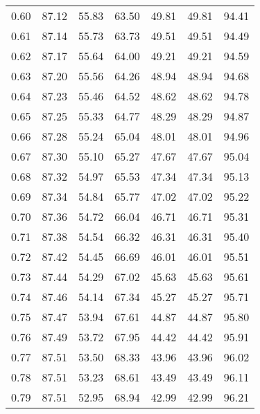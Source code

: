 \begin{tabular}{|c|c|c|c|c|c|c|}
      0.60 &     87.12 &     55.83 &      63.50 &   49.81 &      49.81 &         94.41 \\
      0.61 &     87.14 &     55.73 &      63.73 &   49.51 &      49.51 &         94.49 \\
      0.62 &     87.17 &     55.64 &      64.00 &   49.21 &      49.21 &         94.59 \\
      0.63 &     87.20 &     55.56 &      64.26 &   48.94 &      48.94 &         94.68 \\
      0.64 &     87.23 &     55.46 &      64.52 &   48.62 &      48.62 &         94.78 \\
      0.65 &     87.25 &     55.33 &      64.77 &   48.29 &      48.29 &         94.87 \\
      0.66 &     87.28 &     55.24 &      65.04 &   48.01 &      48.01 &         94.96 \\
      0.67 &     87.30 &     55.10 &      65.27 &   47.67 &      47.67 &         95.04 \\
      0.68 &     87.32 &     54.97 &      65.53 &   47.34 &      47.34 &         95.13 \\
      0.69 &     87.34 &     54.84 &      65.77 &   47.02 &      47.02 &         95.22 \\
      0.70 &     87.36 &     54.72 &      66.04 &   46.71 &      46.71 &         95.31 \\
      0.71 &     87.38 &     54.54 &      66.32 &   46.31 &      46.31 &         95.40 \\
      0.72 &     87.42 &     54.45 &      66.69 &   46.01 &      46.01 &         95.51 \\
      0.73 &     87.44 &     54.29 &      67.02 &   45.63 &      45.63 &         95.61 \\
      0.74 &     87.46 &     54.14 &      67.34 &   45.27 &      45.27 &         95.71 \\
      0.75 &     87.47 &     53.94 &      67.61 &   44.87 &      44.87 &         95.80 \\
      0.76 &     87.49 &     53.72 &      67.95 &   44.42 &      44.42 &         95.91 \\
      0.77 &     87.51 &     53.50 &      68.33 &   43.96 &      43.96 &         96.02 \\
      0.78 &     87.51 &     53.23 &      68.61 &   43.49 &      43.49 &         96.11 \\
      0.79 &     87.51 &     52.95 &      68.94 &   42.99 &      42.99 &         96.21 \\

\end{tabular}

